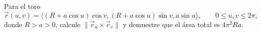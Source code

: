 Para el toro
\[
\vec r(u,v)=\langle(R+a\cos u)\cos v,
(R+a\cos u)\sin v,a\sin u\rangle,
\qquad0\leq u,v\leq2\pi,
\]
donde $R>a>0$, calcule $\lVert\vec r_u\times\vec r_v\rVert$ y demuestre que el área total es $4\pi^2Ra$.
